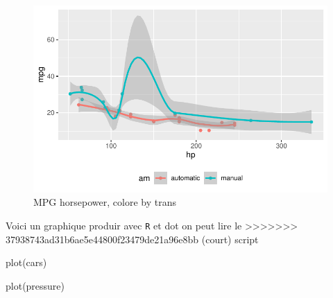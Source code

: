 \documentclass[
  a4paper,
]{scrbook}
\newenvironment{Shaded}{}{}
\newcommand{\FunctionTok}[1]{\textcolor[rgb]{0.44,0.26,0.76}{#1}}
\newcommand{\NormalTok}[1]{\textcolor[rgb]{0.14,0.16,0.18}{#1}}
\begin{document}
\begin{figure}[H]

{\centering \includegraphics{./resultats_files/figure-pdf/fig-mtcars-1.pdf}

}

\caption{\label{fig-mtcars}MPG horsepower, colore by trans}

\end{figure}

Voici un graphique produir avec \texttt{R} et dot on peut lire le
>>>>>>> 37938743ad31b6ae5e44800f23479de21a96e8bb
(court) script

\begin{Shaded}
\begin{Highlighting}[numbers=left,,]
\FunctionTok{plot}\NormalTok{(cars)}

\FunctionTok{plot}\NormalTok{(pressure)}
\end{Highlighting}
\end{Shaded}
\end{document}
